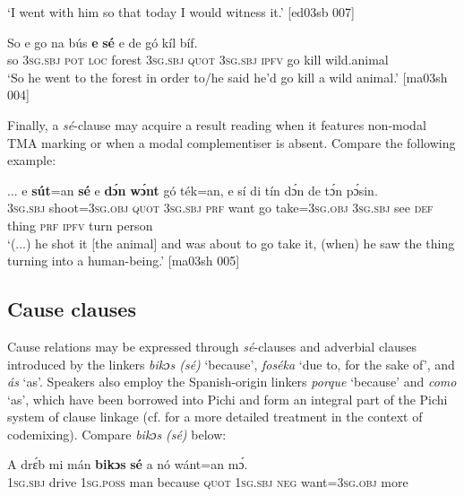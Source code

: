 \glt ‘I went with him so that today I would witness it.’ [ed03sb 007]
\z


\ea%
    \label{ex:key:1502}
    \gll So  e    go  na  bús    \textbf{e}    \textbf{sé}    e    de  gó  kíl  bíf.\\
so  \textsc{3sg.sbj}  \textsc{pot}  \textsc{loc}  forest  \textsc{3sg.sbj}  \textsc{quot}    \textsc{3sg.sbj}  \textsc{ipfv}  go  kill  wild.animal\\

\glt ‘So he went to the forest in order to/he said he’d go kill a wild animal.’ [ma03sh 004]
\z

Finally, a \textit{sé}{}-clause may acquire a result reading when it features non-modal TMA marking or when a modal complementiser is absent. Compare the following example:


\ea%
    \label{ex:key:1503}
    \gll \op...\cp{}  e    \textbf{sút}=an    \textbf{sé}    e    \textbf{dɔ́n}  \textbf{wɔ́nt}  gó  ték=an,
{} e    sí  di  tín    dɔ́n  de  tɔ́n    pɔ́sin.\\
  \textsc{3sg.sbj}  shoot=\textsc{3sg.obj}  \textsc{quot}    \textsc{3sg.sbj}  \textsc{prf}  want  go  take=\textsc{3sg.obj}
\textsc{3sg.sbj}  see  \textsc{def}  thing  \textsc{prf}  \textsc{ipfv}  turn    person\\

\glt ‘(...) he shot it [the animal] and was about to go take it, (when) he saw the thing 
turning into a human-being.’ [ma03sh 005]
\z

\subsection{Cause clauses}\label{sec:10.7.7}

Cause relations may be expressed through \textit{sé}{}-clauses and adverbial clauses introduced by the linkers \textit{bikɔs (sé)} ‘because’, \textit{foséka} ‘due to, for the sake of’, and \textit{ás} ‘as’. Speakers also employ the Spanish-origin linkers \textit{porque} ‘because’ and \textit{como} ‘as’, which have been borrowed into Pichi and form an integral part of the Pichi system of clause linkage (cf.  for a more detailed treatment in the context of codemixing). Compare \textit{bikɔs} \textit{(sé)} below:


\ea%
    \label{ex:key:1504}
    \gll A    drɛ́b    mi    mán    \textbf{bikɔs}  \textbf{sé}    a    nó  wánt=an    mɔ́.\\
\textsc{1sg.sbj}  drive  \textsc{1sg.poss}  man    because  \textsc{quot}    \textsc{1sg.sbj}  \textsc{neg}  want=\textsc{3sg.obj}  more\\

